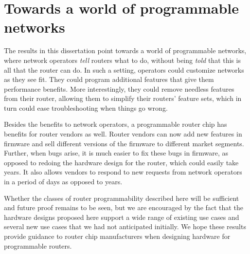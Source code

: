 \section{Towards a world of programmable networks}

The results in this dissertation point towards a world of programmable
networks, where network operators \textit{tell} routers what to do, without
being \textit{told} that this is all that the router can do. In such a setting,
operators could customize networks as they see fit.  They could program
additional features that give them performance benefits.  More interestingly,
they could remove needless features from their router, allowing them to
simplify their routers' feature sets, which in turn could ease troubleshooting
when things go wrong.

Besides the benefits to network operators, a programmable router chip has
benefits for router vendors as well. Router vendors can now add new features in
firmware and sell different versions of the firmware to different market
segments. Further, when bugs arise, it is much easier to fix these bugs in
firmware, as opposed to redoing the hardware design for the router, which could
easily take years. It also allows vendors to respond to new requests from
network operators in a period of days as opposed to years.

Whether the classes of router programmability described here will be sufficient
and future proof remains to be seen, but we are encouraged by the fact that the
hardware designs proposed here support a wide range of existing use cases and
several new use cases that we had not anticipated initially. We hope these
results provide guidance to router chip manufacturers when designing hardware
for programmable routers.

